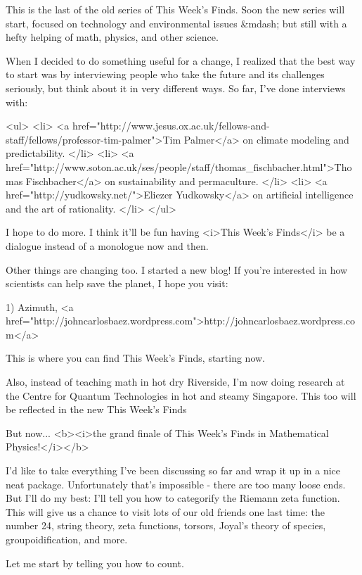 

This is the last of the old series of This Week's Finds.  Soon the new
series will start, focused on technology and environmental issues
&mdash; but still with a hefty helping of math, physics, and other
science.

When I decided to do something useful for a change, I realized
that the best way to start was by interviewing people who take the
future and its challenges seriously, but think about it in very
different ways.  So far, I've done interviews with:

<ul>
<li>
<a href="http://www.jesus.ox.ac.uk/fellows-and-staff/fellows/professor-tim-palmer">Tim Palmer</a> on climate modeling and predictability.
</li>
<li>
<a href="http://www.soton.ac.uk/ses/people/staff/thomas_fischbacher.html">Thomas Fischbacher</a> on sustainability and permaculture.
</li>
<li>
<a href="http://yudkowsky.net/">Eliezer Yudkowsky</a> on artificial intelligence and the art of rationality.
</li>
</ul>

I hope to do more.  I think it'll be fun having <i>This Week's
Finds</i> be a dialogue instead of a monologue now and then.

Other things are changing too.  I started a new blog!  If you're interested in how scientists can help save the planet, I hope you visit:

1) Azimuth, <a href="http://johncarlosbaez.wordpress.com">http://johncarlosbaez.wordpress.com</a>

This is where you can find This Week's Finds, starting now.

Also, instead of teaching math in hot dry Riverside, I'm now doing
research at the Centre for Quantum Technologies in hot and steamy
Singapore.  This too will be reflected in the new This Week's Finds

But now... <b><i>the grand finale of This Week's Finds in Mathematical
Physics!</i></b>

I'd like to take everything I've been discussing so far and wrap
it up in a nice neat package.  Unfortunately that's impossible - there
are too many loose ends. But I'll do my best: I'll tell you how to
categorify the Riemann zeta function.  This will give us a chance to
visit lots of our old friends one last time: the number 24, string
theory, zeta functions, torsors, Joyal's theory of species,
groupoidification, and more.

Let me start by telling you how to count.

